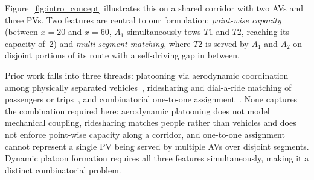 \documentclass[sigconf]{acmart}
\begin{document}
Figure~\ref{fig:intro_concept} illustrates this on a shared corridor with two AVs and three PVs. Two features are central to our formulation: \emph{point-wise capacity} (between $x{=}20$ and $x{=}60$, $A_1$ simultaneously tows $T1$ and $T2$, reaching its capacity of~2) and \emph{multi-segment matching}, where $T2$ is served by $A_1$ and $A_2$ on disjoint portions of its route with a self-driving gap in between.

Prior work falls into three threads: platooning via aerodynamic 
coordination among physically separated vehicles~\cite{tsugawa2016review,
bergenhem2012overview,shladover2009cooperative,ploeg2011design}, 
ridesharing and dial-a-ride matching of passengers or 
trips~\cite{furuhata2013ridesharing,agatz2012optimization,alonso2017demand,
cordeau2007dial}, and combinatorial one-to-one 
assignment~\cite{kuhn1955hungarian,munkres1957algorithms}. None captures 
the combination required here: aerodynamic platooning does not model 
mechanical coupling, ridesharing matches people rather 
than vehicles and does not enforce point-wise capacity along a corridor, 
and one-to-one assignment cannot represent a single PV being served by 
multiple AVs over disjoint segments. Dynamic platoon formation requires 
all three features simultaneously, making it a distinct combinatorial 
problem.
\end{document}
